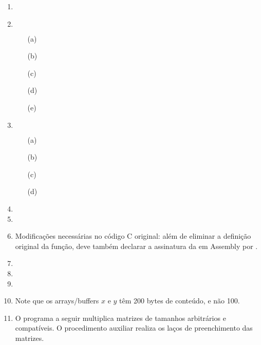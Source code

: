 \begin{enumerate}
    \item

    \item $\!$
    \begin{itemize}
        \item [(a)] 
        \item [(b)] 
        \item [(c)] 
        \item [(d)] 
        \item [(e)] 
    \end{itemize}
    
    \item $\!$
    \begin{itemize}
        \item [(a)] 
        \item [(b)] 
        \item [(c)] 
        \item [(d)] 
    \end{itemize}

    \item 

    \item

    \item
    Modificações necessárias no código C original:
    além de eliminar a definição original da função,
    deve também declarar a assinatura da  em Assembly por
    .

    \item

    \item

    \item

    \item
    Note que os arrays/buffers $x$ e $y$ têm 200 bytes de conteúdo, e não 100.
    \item
    O programa a seguir multiplica matrizes
    de tamanhos arbitrários e compatíveis.
    O procedimento auxiliar 
    realiza os laços de preenchimento das matrizes.


\end{enumerate}

